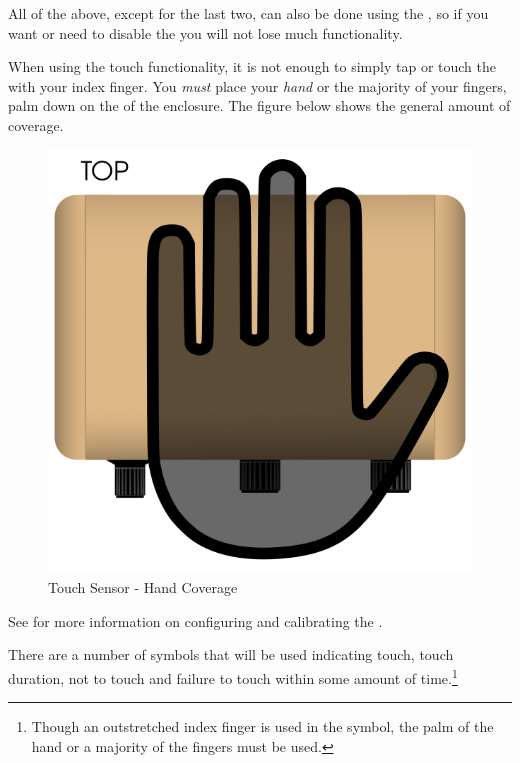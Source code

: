 All of the above, except for the last two, can also be done using the ,
so if you want or need to disable the  you will not lose much
functionality.

\par\medskip

When using the touch functionality, it is not enough to simply tap or touch
the  with your index finger.  You \textit{must} place your \textit{hand}
or the majority of your fingers, palm down on the  of the enclosure.
The figure below shows the general amount of coverage.

\begin{figure}[H]
\centering
  \includegraphics{images/touch_hand_coverage.png}
\caption{Touch Sensor - Hand Coverage} \label{fig:Hand Coverage}
\end{figure}

See \hyperref[Touch Settings]{} for more information on configuring and
calibrating the .

\par\medskip

There are a number of symbols that will be used indicating touch, touch
duration, not to touch and failure to touch within some amount of
time.\footnote{ Though an outstretched index finger is used in the symbol, the
palm of the hand or a majority of the fingers must be used.}

